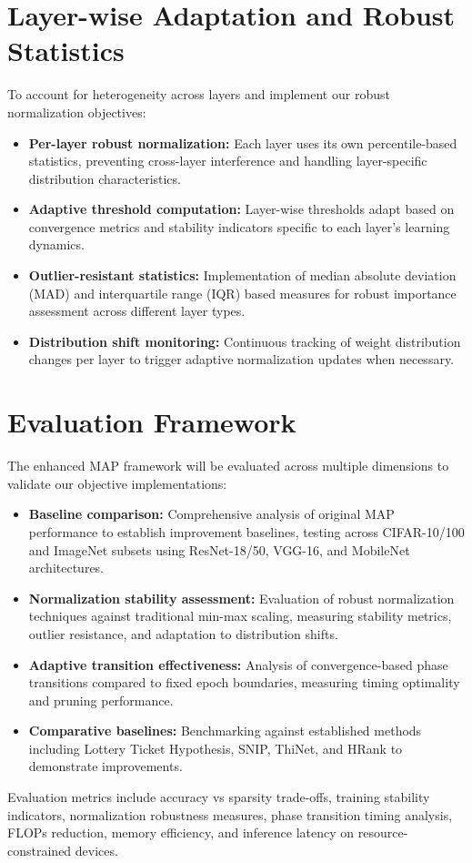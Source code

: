 \documentclass[12pt,a4paper]{report}
\begin{document}
\section{Layer-wise Adaptation and Robust Statistics}
To account for heterogeneity across layers and implement our robust normalization objectives:
\begin{itemize}
    \item \textbf{Per-layer robust normalization:} Each layer uses its own percentile-based statistics, preventing cross-layer interference and handling layer-specific distribution characteristics.
    \item \textbf{Adaptive threshold computation:} Layer-wise thresholds adapt based on convergence metrics and stability indicators specific to each layer's learning dynamics.
    \item \textbf{Outlier-resistant statistics:} Implementation of median absolute deviation (MAD) and interquartile range (IQR) based measures for robust importance assessment across different layer types.
    \item \textbf{Distribution shift monitoring:} Continuous tracking of weight distribution changes per layer to trigger adaptive normalization updates when necessary.
\end{itemize}

\section{Evaluation Framework}
The enhanced MAP framework will be evaluated across multiple dimensions to validate our objective implementations:
\begin{itemize}
    \item \textbf{Baseline comparison:} Comprehensive analysis of original MAP performance to establish improvement baselines, testing across CIFAR-10/100 and ImageNet subsets using ResNet-18/50, VGG-16, and MobileNet architectures.
    \item \textbf{Normalization stability assessment:} Evaluation of robust normalization techniques against traditional min-max scaling, measuring stability metrics, outlier resistance, and adaptation to distribution shifts.
    \item \textbf{Adaptive transition effectiveness:} Analysis of convergence-based phase transitions compared to fixed epoch boundaries, measuring timing optimality and pruning performance.
    \item \textbf{Comparative baselines:} Benchmarking against established methods including Lottery Ticket Hypothesis, SNIP, ThiNet, and HRank to demonstrate improvements.
\end{itemize}
Evaluation metrics include accuracy vs sparsity trade-offs, training stability indicators, normalization robustness measures, phase transition timing analysis, FLOPs reduction, memory efficiency, and inference latency on resource-constrained devices.
\end{document}
